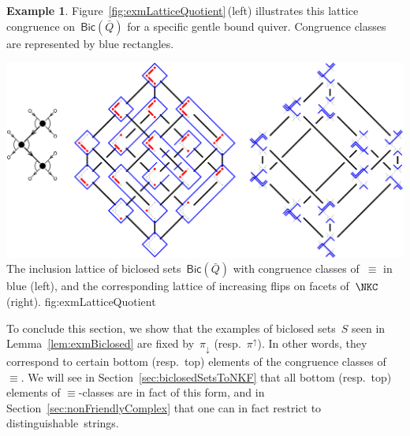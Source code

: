 \documentclass{memo-l}
\theoremstyle{definition}
\newtheorem{example}[theorem]{Example}
\newcommand{\fref}[1]{Figure~\ref{#1}} %
\newcommand{\Bicl}[1]{\mathsf{Bic}(#1)} %
\newcommand{\projDown}{\pi_\downarrow} %
\newcommand{\projUp}{\pi^\uparrow} %
\begin{document}
\begin{example}
\fref{fig:exmLatticeQuotient}\,(left) illustrates this lattice congruence on~$\Bicl{\bar Q}$ for a specific gentle bound quiver.
Congruence classes are represented by blue rectangles.

\captionsetup{width=1.5\textwidth}
{\includegraphics[scale=.65]{exmLatticeQuotient}}
{The inclusion lattice of biclosed sets~$\Bicl{\bar Q}$ with congruence classes of~$\equiv$ in blue (left), and the corresponding lattice of increasing flips on facets of~$\NKC$ (right).}
{fig:exmLatticeQuotient}
\captionsetup{width=\textwidth}

\end{example}

To conclude this section, we show that the examples of biclosed sets~$S$ seen in Lemma~\ref{lem:exmBiclosed} are fixed by~$\projDown$ (resp.~$\projUp$).
In other words, they correspond to certain bottom (resp.~top) elements of the congruence classes of~$\equiv$.
We will see in Section~\ref{sec:biclosedSetsToNKF} that all bottom (resp.~top) elements of $\equiv$-classes are in fact of this form, and in Section~\ref{sec:nonFriendlyComplex} that one can in fact restrict to distinguishable~strings.
\end{document}
